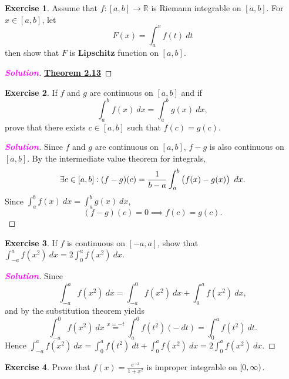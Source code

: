 \documentclass[12pt,openany]{book}
\theoremstyle{definition}
\newtheorem{exercise}{Exercise}[chapter]
\newcommand{\R}{\mathbb{R}}
\newcommand{\sol}{\textcolor{magenta}{\bf Solution}}
\begin{document}
	\vspace{7pt}
	\begin{tcolorbox}[colframe=execolor, title={\color{white}\bf}]
		\begin{exercise}
			Assume that $f:[a,b]\to\R$ is Riemann integrable on $[a,b]$. For $x\in[a,b]$, let \[
			F(x)=\int_a^xf(t)\ dt
			\] then show that $F$ is \textbf{Lipschitz} function on $[a,b]$.
		\end{exercise}
	\end{tcolorbox}
	\begin{proof}[\sol]
		\hyperlink{thm2.13}{\bf Theorem 2.13}
	\end{proof}
	\vspace{15pt}
	\begin{tcolorbox}[colframe=execolor, title={\color{white}\bf}]
		\begin{exercise}
			If $f$ and $g$ are continuous on $[a,b]$ and if \[
			\int_a^bf(x)\ dx=\int_a^bg(x)\ dx,
			\] prove that there exists $c\in[a,b]$ such that $f(c)=g(c)$.
		\end{exercise}
	\end{tcolorbox}
	\begin{proof}[\sol]
		Since $f$ and $g$ are continuous on $[a,b]$, $f-g$ is also continuous on $[a,b]$. By the intermediate value theorem for integrals, \[
		\exists c\in[a,b]:(f-g)(c)=\frac{1}{b-a}\int_a^b\del{f(x)-g(x)}\ dx.
		\] Since $\int_a^bf(x)\ dx=\int_a^bg(x)\ dx$, \[
		(f-g)(c)=0\implies f(c)=g(c).
		\]
	\end{proof}
	\vspace{15pt}
	\begin{tcolorbox}[colframe=execolor, title={\color{white}\bf}]
		\begin{exercise}
			If $f$ is continuous on $[-a,a]$, show that $\displaystyle\int_{-a}^af(x^2)\ dx=2\int_0^af(x^2)\ dx$.
		\end{exercise}
	\end{tcolorbox}
	\begin{proof}[\sol]
		Since \[
		\int_{-a}^af(x^2)\ dx = \int_{-a}^0f(x^2)\ dx+\int_0^af(x^2)\ dx,
		\] and by the substitution theorem yields \[
		\int_{-a}^0f(x^2)\ dx\overset{x=-t}{=}\int_a^0f(t^2)(-\ dt)=\int_0^af(t^2)\ dt.
		\] Hence $\int_{-a}^af(x^2)\ dx = \int_{0}^af(t^2)\ dt+\int_0^af(x^2)\ dx=2\int_0^af(x^2)\ dx$.
	\end{proof}
	\vspace{15pt}
	\begin{tcolorbox}[colframe=execolor, title={\color{white}\bf}]
		\begin{exercise}
			Prove that $\displaystyle f(x)=\frac{e^{-x}}{1+x^2}$ is improper integrable on $\intco{0,\infty}$.
		\end{exercise}
	\end{tcolorbox}
\end{document}
